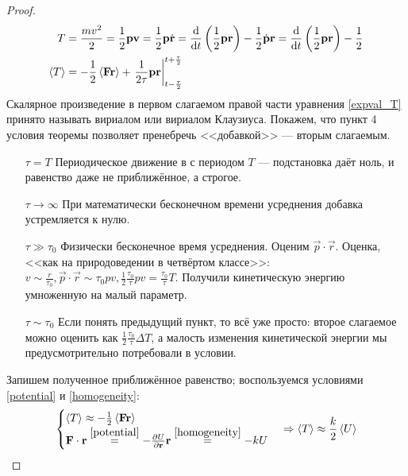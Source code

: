 \begin{proof}
\begin{align}
T &= \frac{mv^2}{2} = \frac{1}{2} {\vb{p} \vb{v}} = \frac{1}{2} {\vb{p}  \dot{\vb{r}}} = \dv{t} \left( \frac{1}{2} \vb{p}  \vb{r} \right) - \frac{1}{2} \dot{\vb{p}}  \vb{r} =  \dv{t} \left(\frac{1}{2} \vb{p}  \vb{r} \right) - \frac{1}{2} \notag\\
\expval{T} &= -\frac{1}{2} \expval{\vb{F} \vb{r}} + \left. \frac{1}{2\tau} \vb{p} \vb{r} \right|_{t-\frac{\tau}{2}}^{t+\frac{\tau}{2}} \label{expval_T}
\end{align}
Скалярное произведение в первом слагаемом правой части уравнения \eqref{expval_T} принято называть вириалом или вириалом Клаузиуса.  Покажем, что пункт 4 условия теоремы позволяет пренебречь  <<добавкой>> --- вторым слагаемым.
\begin{itemize}
\item[$\tau = T$] Периодическое движение в с периодом $T$ --- подстановка даёт ноль, и равенство даже не приближённое, а строгое.
\item[$\tau \rightarrow \infty$] При математически бесконечном времени усреднения добавка устремляется к нулю.
\item[$\tau \gg \tau_0$] Физически бесконечное время усреднения. Оценим $\vec{p} \cdot \vec{r}$. Оценка, <<как на природоведении в четвёртом классе>>: $v \sim \frac{r}{\tau_0}, \vec{p} \cdot \vec{r} \sim \tau_0 p v, \frac{1}{2} \frac{\tau_0}{\tau} pv = \frac{\tau_0}{\tau} T$. Получили кинетическую энергию умноженную на малый параметр.
\item[$\tau \sim \tau_0$] Если понять предыдущий пункт, то всё уже просто: второе слагаемое можно оценить как $\frac{1}{2	}\frac{\tau_0}{\tau} \Delta{T}$, а малость изменения кинетической энергии мы предусмотрительно потребовали в условии.
\end{itemize}
Запишем полученное приближённое равенство; воспользуемся условиями \ref{potential} и \ref{homogeneity}:
\begin{equation*}
\begin{cases}
\expval{T} \approx - \frac{1}{2} \expval{\vb{F} \vb{r}}\\
\vb{F} \cdot \vb{r} \is{potential}  -\pdv{U}{\vb{r}} \vb{r} \is{homogeneity} - kU
\end{cases}
\Rightarrow \expval{T} \approx \frac{k}{2} \expval U
\end{equation*}
\end{proof}

